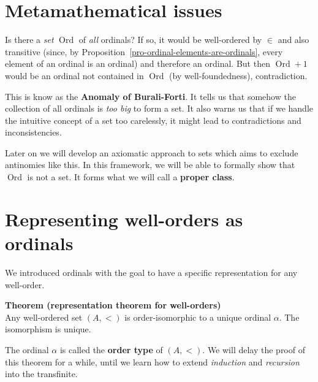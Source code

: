 \documentclass{article}
\newcommand{\Ord}{\operatorname{Ord}}
\begin{document}
\section{Metamathematical issues}

Is there a \textit{set} $\Ord$ of \textit{all} ordinals? If so, it would be well-ordered by $\in$ and also transitive (since, by Proposition~\ref{pro-ordinal-elements-are-ordinals}, every element of an ordinal is an ordinal) and therefore an ordinal. But then $\Ord+1$ would be an ordinal not contained in $\Ord$ (by well-foundedness), contradiction.

This is know as the \textbf{Anomaly of Burali-Forti}. It tells us that somehow the collection of all ordinals is \textit{too big} to form a set. It also warns us that if we handle the intuitive concept of a set too carelessly, it might lead to contradictions and inconsistencies.

Later on we will develop an axiomatic approach to sets which aims to exclude antinomies like this. In this framework, we will be able to formally show that $\Ord$ is not a set. It forms what we will call a \textbf{proper class}.

\section{Representing well-orders as ordinals}

We introduced ordinals with the goal to have a specific representation for any well-order.

\begin{framed}
\textbf{Theorem (representation theorem for well-orders)}\\
Any well-ordered set $(A,<)$ is order-isomorphic to a unique ordinal $\alpha$. The isomorphism is unique.
\end{framed}

The ordinal $\alpha$ is called the \textbf{order type} of $(A,<)$.
We will delay the proof of this theorem for a while, until we learn how to extend \textit{induction} and \textit{recursion} into the transfinite.
\end{document}

